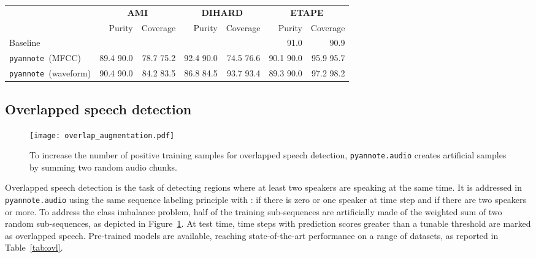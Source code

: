 \documentclass{article}
\def\pyannote{{\small\texttt{pyannote}}}
\begin{document}
\begin{table*}[]
    \centering
    \begin{tabular}{|l|r|r|r|r|r|r|}
        \hline
        & \multicolumn{2}{c|}{\textbf{AMI}} & \multicolumn{2}{c|}{\textbf{DIHARD}} & \multicolumn{2}{c|}{\textbf{ETAPE}} \\
        & Purity & Coverage & Purity & Coverage & Purity & Coverage \\
        \hline
        Baseline &  &  &  &  & {\scriptsize{91.0}} \cite{Yin2017} & {\scriptsize{90.9}} \cite{Yin2017}\\
        \hline
        \pyannote~(MFCC)    & 89.4 \scriptsize{90.0} & 78.7 \scriptsize{75.2} & 92.4 \scriptsize{90.0} &  74.5 \scriptsize{76.6} & 90.1 \scriptsize{90.0} & 95.9 \scriptsize{95.7}   \\
        \pyannote~(waveform) & 90.4 \scriptsize{90.0} & 84.2 \scriptsize{83.5} & 86.8 \scriptsize{84.5} & 93.7 \scriptsize{93.4} & 89.3 \scriptsize{90.0} & 97.2 \scriptsize{98.2}  \\
        \hline

    \end{tabular}
    \caption{Evaluation of pre-trained speaker change detection models, in terms of speech turn coverage (\%) and purity (\%). Results on the development set are reported using small font size. We report two {\small{\texttt{pyannote.audio}}} variants: the first one is based on handcrafted features (MFCCs) and the other one is an end-to-end model processing the waveform directly.
\emph{Baseline} corresponds to the best result we could find in the literature as of October 2019.}
    \label{tab:scd}
\end{table*}

\vspace{-0.17cm}
\subsection{Overlapped speech detection}
\label{ssec:ovl}

\begin{figure}
    \centering
    \texttt{[image: overlap\_augmentation.pdf]}
    \caption{To increase the number of positive training samples for overlapped speech detection, {\small \texttt{pyannote.audio}} creates artificial samples by summing two random audio chunks.}
    \label{fig:ovl}
\end{figure}

Overlapped speech detection is the task of detecting regions where at least two speakers are speaking at the same time. It is addressed in {\small\texttt{pyannote.audio}} using the same sequence labeling principle with :  if there is zero or one speaker at time step  and  if there are two speakers or more. To address the class imbalance problem, half of the training sub-sequences are artificially made of the weighted sum of two random sub-sequences, as depicted in Figure~\ref{fig:ovl}. At test time, time steps with prediction scores greater than a tunable threshold  are marked as overlapped speech. Pre-trained models are available, reaching state-of-the-art performance on a range of datasets, as reported in Table~\ref{tab:ovl}.
\end{document}
